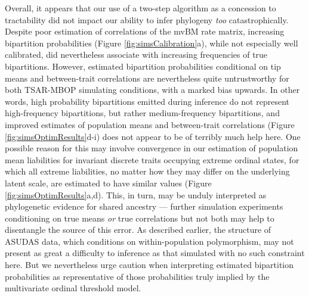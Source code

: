 \documentclass[10pt, twocolumn, twoside]{article}
\begin{document}
Overall, it appears that our use of a two-step algorithm as a concession to tractability did not impact our ability to infer phylogeny \textit{too} catastrophically. Despite poor estimation of correlations of the mvBM rate matrix, increasing bipartition probabilities (Figure \ref{fig:simsCalibration}a), while not especially well calibrated, did nevertheless associate with increasing frequencies of true bipartitions. However, estimated bipartition probabilities conditional on tip means and between-trait correlations are nevertheless quite untrustworthy for both TSAR-MBOP simulating conditions, with a marked bias upwards. In other words, high probability bipartitions emitted during inference do not represent high-frequency bipartitions, but rather medium-frequency bipartitions, and improved estimates of population means and between-trait correlations (Figure \ref{fig:simsOptimResults}d-i) does not appear to be of terribly much help here. One possible reason for this may involve convergence in our estimation of population mean liabilities for invariant discrete traits occupying extreme ordinal states, for which all extreme liabilities, no matter how they may differ on the underlying latent scale, are estimated to have similar values (Figure \ref{fig:simsOptimResults}a,d). This, in turn, may be unduly interpreted as phylogenetic evidence for shared ancestry --- further simulation experiments conditioning on true means \textit{or} true correlations but not both may help to disentangle the source of this error. As described earlier, the structure of ASUDAS data, which conditions on within-population polymorphism, may not present as great a difficulty to inference as that simulated with no such constraint here. But we nevertheless urge caution when interpreting estimated bipartition probabilities as representative of those probabilities truly implied by the multivariate ordinal threshold model.
\end{document}
